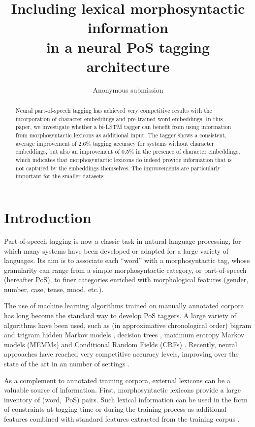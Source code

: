 \documentclass[11pt,letterpaper]{article}
\title{Including lexical morphosyntactic information\\in a neural PoS tagging architecture}
\author{Anonymous submission}
\date{}
\begin{document}
\maketitle

\begin{abstract}
  Neural part-of-speech tagging has achieved very competitive results with the incorporation of character embeddings and pre-trained word embeddings. In this paper, we investigate whether a bi-LSTM tagger can benefit from using information from morphosyntactic lexicons as additional input. The tagger shows a consistent, average improvement of 2.6\% tagging accuracy for systems without character embeddings, but also an improvement of 0.5\% in the presence of character embeddings, which indicates that morphosyntactic lexicons do indeed provide information that is not captured by the embeddings themselves. The improvements are particularly important for the smaller datasets.
\end{abstract}


\section{Introduction}

Part-of-speech tagging is now a classic task in natural language processing, for which many systems have been developed
or adapted for a large variety of languages. Its aim is to associate each ``word'' with a morphosyntactic tag, whose
granularity can range from a simple morphosyntactic category, or part-of-speech (hereafter PoS), to finer categories
enriched with morphological features (gender, number, case, tense, mood, etc.).

The use of machine learning algorithms trained on manually annotated corpora has long become the standard way to develop
PoS taggers. A large variety of algorithms have been used, such as (in approximative chronological order) bigram and
trigram hidden Markov models \cite{merialdo94,brants96,brants00}, decision trees \cite{schmid94,magerman95}, maximum
entropy Markov models (MEMMs) \cite{ratnaparkhi96} and Conditional Random Fields (CRFs)
\cite{lafferty01,constant12}. Recently, neural approaches have reached very competitive accuracy levels, improving over
the state of the art in an number of settings \cite{plank16}.

As a complement to  annotated training corpora, external lexicons can be a valuable source of information.
First, morphosyntactic lexicons provide a large inventory of (word,~PoS)
pairs. Such lexical information can be used in the form of constraints at tagging time \cite{kim99,hajic00tagging} or
during the training process as additional features combined with standard features extracted from the training corpus
\cite{chrupala08,goldberg09,denis12}.
\end{document}
